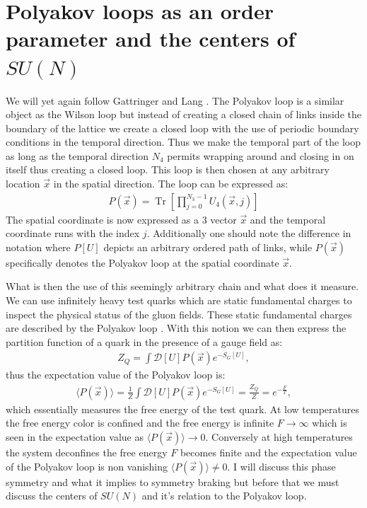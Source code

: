 \documentclass[english,twoside,openright]{UH_TCM_MSc}
\DeclareMathOperator{\Tr}{Tr}
\begin{document}
\section{Polyakov loops as an order parameter and the centers of $SU(N)$}

We will yet again follow Gattringer and Lang \cite[ch. 3.3.5]{gattringer2009quantum}. The Polyakov loop \cite{POLYAKOV197582} is a similar object as the Wilson loop \cite[ch. 3.3.1]{gattringer2009quantum} but instead of creating a closed chain of links inside the boundary of the lattice we create a closed loop with the use of periodic boundary conditions in the temporal direction. Thus we make the temporal part of the loop as long as the temporal direction $N_4$ permits wrapping around and closing in on itself thus creating a closed loop. This loop is then chosen at any arbitrary location $\vec{x}$ in the spatial direction. The loop can be expressed as:
\begin{align}
    P(\Vec{x}) = \Tr\left[\prod_{j=0}^{N_3 -1} U_4(\Vec{x},j)\right]
\end{align}
The spatial coordinate is now expressed as a 3 vector $\Vec{x}$ and the temporal coordinate runs with the index $j$. Additionally one should note the difference in notation where $P[U]$ depicts an arbitrary ordered path of links, while $P(\Vec{x})$ specifically denotes the Polyakov loop at the spatial coordinate $\Vec{x}$.

What is then the use of this seemingly arbitrary chain and what does it measure. We can use infinitely heavy test quarks which are static fundamental charges to inspect the physical status of the gluon fields. These static fundamental charges are described by the Polyakov loop \cite[ch. 2.3]{HOLLAND_2001}. With this notion we can then express the partition function of a quark in the presence of a gauge field as:
\begin{align}
    Z_Q = \int \mathcal{D}[U]P(\Vec{x}) e^{-S_G[U]},
\end{align}
thus the expectation value of the Polyakov loop is:
\begin{align}
    \langle P(\Vec{x}) \rangle = \frac{1}{Z}\int \mathcal{D}[U]P(\Vec{x}) e^{-S_G[U]} = \frac{Z_Q}{Z} = e^{-\frac{F}{T}},
\end{align}
which essentially measures the free energy of the test quark. At low temperatures the free energy color is confined and the free energy is infinite $F \rightarrow \infty$ which is seen in the expectation value as $\langle P(\Vec{x}) \rangle \rightarrow 0$. Conversely at high temperatures the system deconfines the free energy $F$ becomes finite and the expectation value of the Polyakov loop is non vanishing $\langle P(\Vec{x}) \rangle \neq 0$. I will discuss this phase symmetry and what it implies to symmetry braking but before that we must discuss the centers of $SU(N)$ and it's relation to the Polyakov loop.
\end{document}
